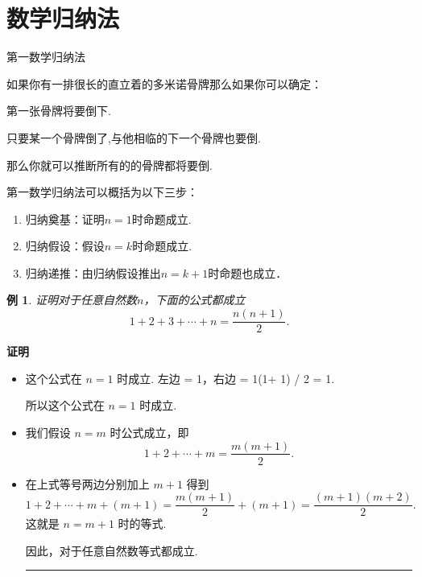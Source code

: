 \documentclass[13pt]{beamer}
\newtheorem{exa}{例}
\def\qed{\nopagebreak\hfill{\rule{4pt}{7pt}}\medbreak}
\def\pf{{\bf 证明~~ }}
\begin{document}
\section{数学归纳法}

\begin{frame}{第一数学归纳法}


如果你有一排很长的直立着的多米诺骨牌那么如果你可以确定：

第一张骨牌将要倒下. 

只要某一个骨牌倒了,与他相临的下一个骨牌也要倒. 

那么你就可以推断所有的的骨牌都将要倒. \\[15pt]

\pause

第一数学归纳法可以概括为以下三步：
\begin{enumerate}
\item 归纳奠基：证明$n=1$时命题成立.
\item 归纳假设：假设$n=k$时命题成立.
\item 归纳递推：由归纳假设推出$n=k+1$时命题也成立．
\end{enumerate}
\end{frame}

\begin{frame}
\begin{exa}
证明对于任意自然数$n$，下面的公式都成立
\[
1+2+3+\cdots+n=\frac{n(n+1)}{2}.
\]
\end{exa}

\pf 
\begin{itemize}
\item 这个公式在 $n=1$ 时成立.  左边 = 1，右边 = 1(1+ 1) / 2 = 1. 

所以这个公式在 $n=1$ 时成立. 
\item 我们假设 $n=m$ 时公式成立，即
\[
1+2+\cdots+m=\frac{m(m+1)}{2}.
\]
\item 在上式等号两边分别加上 $m+1$ 得到
\[
1+2+\cdots+m+(m+1)=\frac{m(m+1)}{2}+(m+1) = \frac{(m+1)(m+2)}{2}.
\]
这就是 $n=m+1$ 时的等式. 

因此，对于任意自然数等式都成立. \qed
\end{itemize}
\end{frame}
\end{document}

